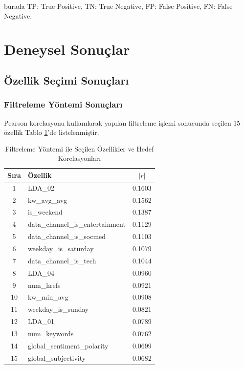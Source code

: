 \documentclass[conference]{IEEEtran}
\begin{document}
burada TP: True Positive, TN: True Negative, FP: False Positive, FN: False Negative.

\section{Deneysel Sonuçlar}

\subsection{Özellik Seçimi Sonuçları}

\subsubsection{Filtreleme Yöntemi Sonuçları}

Pearson korelasyonu kullanılarak yapılan filtreleme işlemi sonucunda seçilen 15 özellik Tablo \ref{tab:filter_features}'de listelenmiştir.

\begin{table}[H]
\centering
\caption{Filtreleme Yöntemi ile Seçilen Özellikler ve Hedef Korelasyonları}
\label{tab:filter_features}
\begin{tabular}{clc}
\toprule
\textbf{Sıra} & \textbf{Özellik} & \textbf{$|r|$} \\
\midrule
1 & LDA\_02 & 0.1603 \\
2 & kw\_avg\_avg & 0.1562 \\
3 & is\_weekend & 0.1387 \\
4 & data\_channel\_is\_entertainment & 0.1129 \\
5 & data\_channel\_is\_socmed & 0.1103 \\
6 & weekday\_is\_saturday & 0.1079 \\
7 & data\_channel\_is\_tech & 0.1044 \\
8 & LDA\_04 & 0.0960 \\
9 & num\_hrefs & 0.0921 \\
10 & kw\_min\_avg & 0.0908 \\
11 & weekday\_is\_sunday & 0.0821 \\
12 & LDA\_01 & 0.0789 \\
13 & num\_keywords & 0.0762 \\
14 & global\_sentiment\_polarity & 0.0699 \\
15 & global\_subjectivity & 0.0682 \\
\bottomrule
\end{tabular}
\end{table}
\end{document}
